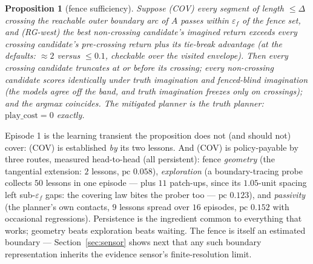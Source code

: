 \documentclass[11pt]{article}
\newtheorem{proposition}{Proposition}
\theoremstyle{remark}
\begin{document}
\begin{proposition}[fence sufficiency]
\label{prop:fence}
Suppose \textup{(COV)} every segment of length $\le \Delta$ crossing the
reachable outer boundary arc of $A$ passes within $\varepsilon_f$ of the
fence set, and \textup{(RG-west)} the best non-crossing candidate's
imagined return exceeds every crossing candidate's pre-crossing return plus
its tie-break advantage (at the defaults: ${\approx}2$ versus
${\le}0.1$, checkable over the visited envelope). Then every crossing
candidate truncates at or before its crossing; every non-crossing candidate
scores identically under truth imagination and fenced-blind imagination
(the models agree off the band, and truth imagination freezes only on
crossings); and the argmax coincides. The mitigated planner \emph{is} the
truth planner: $\mathrm{play\_cost} = 0$ exactly.
\end{proposition}

Episode 1 is the learning transient the proposition does not (and should
not) cover: (COV) is established \emph{by} its two lessons. And (COV) is
policy-payable by three routes, measured head-to-head (all persistent):
fence \emph{geometry} (the tangential extension: $2$ lessons,
$\mathrm{pc}$ $0.058$), \emph{exploration} (a boundary-tracing probe
collects $50$ lessons in one episode --- plus $11$ patch-ups, since its
$1.05$-unit spacing left sub-$\varepsilon_f$ gaps: the covering law bites
the prober too --- $\mathrm{pc}$ $0.123$), and \emph{passivity} (the
planner's own contacts, $9$ lessons spread over $16$ episodes,
$\mathrm{pc}$ $0.152$ with occasional regressions). Persistence is the
ingredient common to everything that works; geometry beats exploration
beats waiting. The fence is itself an estimated boundary ---
Section~\ref{sec:sensor} shows next that any such boundary
representation inherits the evidence sensor's finite-resolution limit.
\end{document}
